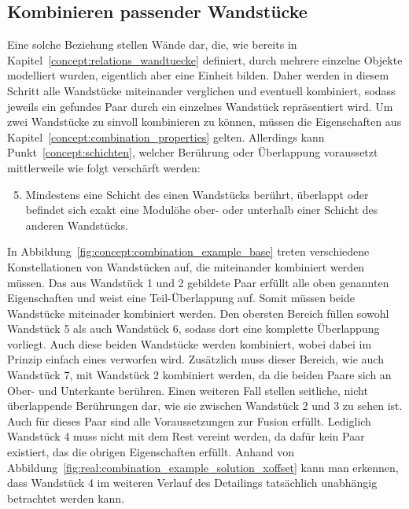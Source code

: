 \subsection{Kombinieren passender Wandstücke}
\label{real:combination}
Eine solche Beziehung stellen Wände dar, die, wie bereits in Kapitel~\ref{concept:relations_wandtuecke} definiert, durch mehrere einzelne Objekte modelliert wurden, eigentlich aber eine Einheit bilden.
Daher werden in diesem Schritt alle Wandstücke miteinander verglichen und eventuell kombiniert, sodass jeweils ein gefundes Paar durch ein einzelnes Wandstück repräsentiert wird.
Um zwei Wandstücke zu sinvoll kombinieren zu können, müssen die Eigenschaften aus Kapitel~\ref{concept:combination_properties} gelten.
Allerdings kann Punkt~\ref{concept:schichten}, welcher Berührung oder Überlappung voraussetzt mittlerweile wie folgt verschärft werden:

\begin{enumerate}
\setcounter{enumi}{4}
\item\label{real:schichten} Mindestens eine Schicht des einen Wandstücks berührt, überlappt oder befindet sich exakt eine Modulöhe ober- oder unterhalb einer Schicht des anderen Wandstücks.
\end{enumerate}

In Abbildung~\ref{fig:concept:combination_example_base} treten verschiedene Konstellationen von Wandstücken auf, die miteinander kombiniert werden müssen.
Das aus Wandstück 1 und 2 gebildete Paar erfüllt alle oben genannten Eigenschaften und weist eine Teil-Überlappung auf.
Somit müssen beide Wandstücke miteinader kombiniert werden.
Den obersten Bereich füllen sowohl Wandstück 5 als auch Wandstück 6, sodass dort eine komplette Überlappung vorliegt.
Auch diese beiden Wandstücke werden kombiniert, wobei dabei im Prinzip einfach eines verworfen wird.
Zusätzlich muss dieser Bereich, wie auch Wandstück 7, mit Wandstück 2 kombiniert werden, da die beiden Paare sich an Ober- und Unterkante berühren.
Einen weiteren Fall stellen seitliche, nicht überlappende Berührungen dar, wie sie zwischen Wandstück 2 und 3 zu sehen ist.
Auch für dieses Paar sind alle Voraussetzungen zur Fusion erfüllt.
Lediglich Wandstück 4 muss nicht mit dem Rest vereint werden, da dafür kein Paar existiert, das die obrigen Eigenschaften erfüllt.
Anhand von Abbildung~\ref{fig:real:combination_example_solution_xoffset} kann man erkennen, dass Wandstück 4 im weiteren Verlauf des Detailings tatsächlich unabhängig betrachtet werden kann. 

